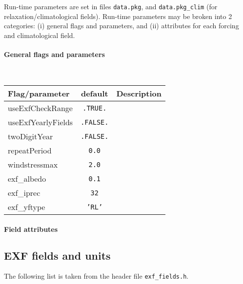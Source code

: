 Run-time parameters are set in files \texttt{data.pkg},
and \texttt{data.pkg\_clim} (for relaxation/climatological fields).
Run-time parameters may be broken into 2 categories:
(i) general flags and parameters, and
(ii) attributes for each forcing and climatological field.

\paragraph{General flags and parameters}

\begin{table}[h!]
  \label{tab:pkg:exf:runtime_flags}
  {\footnotesize
    \begin{tabular}{|l|cl|}
      \hline 
      \textbf{Flag/parameter} & \textbf{default} &  \textbf{Description}  \\
      \hline \hline
        useExfCheckRange & \texttt{.TRUE.} & ~ \\
        useExfYearlyFields & \texttt{.FALSE.} & ~ \\
        twoDigitYear & \texttt{.FALSE.} & ~ \\
        repeatPeriod & \texttt{0.0} & ~ \\
        windstressmax & \texttt{2.0} & ~ \\
        exf\_albedo & \texttt{0.1} & ~ \\
        exf\_iprec  & \texttt{32} & ~ \\
        exf\_yftype & \texttt{'RL'} & ~ \\
      \hline
    \end{tabular}
  }
  \caption{~}
\end{table}


\paragraph{Field attributes}




\subsection{EXF fields and units
\label{sec:pkg:exf:fields_units}}

The following list is taken from the header file \texttt{exf\_fields.h}.

